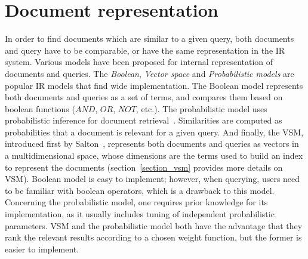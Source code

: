 \section{Document representation}
\label{sec:lsa:doc_repres}
In order to find documents which are similar to a given query, both documents and query have to be comparable, or have the same representation in the \gls{IR} system. Various models have been proposed for internal representation of documents and queries. The \textit{Boolean}, \textit{Vector space} and \textit{Probabilistic models} are popular \gls{IR} models that find wide implementation. The Boolean model represents both documents and queries as a set of terms, and compares them based on boolean functions ($AND$, $OR$, $NOT$, etc.). The probabilistic model uses probabilistic inference for document retrieval~\cite{probabilistic77}. Similarities are computed as probabilities that a document is relevant for a given query. And finally, the \gls{VSM}, introduced first by Salton~\cite{VSM_Salton89}, represents both documents and queries as vectors in a multidimensional space, whose dimensions are the terms used to build an index to represent the documents (section~\ref{section_vsm} provides more details on \gls{VSM}). Boolean model is easy to implement; however, when querying, users need to be familiar with boolean operators, which is a drawback to this model. Concerning the probabilistic model, one requires prior knowledge for its implementation, as it usually includes tuning of independent probabilistic parameters. \gls{VSM} and the probabilistic model both have the advantage that they rank the relevant results according to a chosen weight function, but the former is easier to implement. \\

